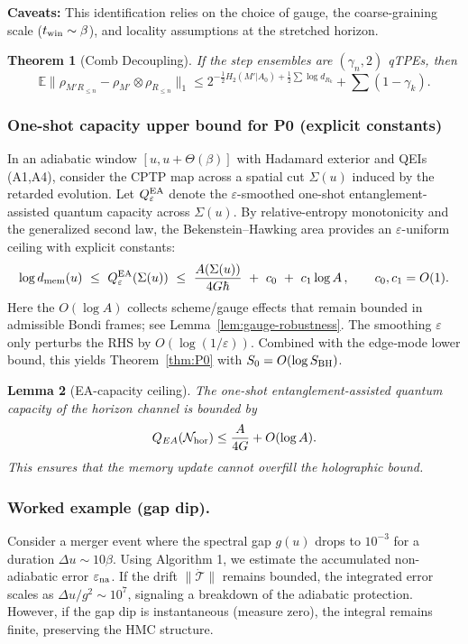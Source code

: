 \documentclass[aps,prd,preprint,onecolumn,superscriptaddress,nofootinbib,longbibliography,floatfix,11pt,showpacs,showkeys]{revtex4-2}
\theoremstyle{plain}
\newtheorem{theorem}{Theorem}
\newtheorem{lemma}[theorem]{Lemma}
\theoremstyle{definition}
\theoremstyle{remark}
\begin{document}
\textbf{Caveats:} This identification relies on the choice of gauge, the coarse-graining scale ($t_{\rm win} \sim \beta$), and locality assumptions at the stretched horizon.

\begin{theorem}[Comb Decoupling]\label{thm:decoupling-restated}
If the step ensembles are $(\gamma_n,2)$ qTPEs, then
\[
\mathbb{E}\|\rho_{M'R_{\le n}}-\rho_{M'}\otimes\rho_{R_{\le n}}\|_1 \le 2^{-\frac{1}{2}H_2(M'|A_0) + \frac{1}{2}\sum \log d_{R_k}} + \sum (1-\gamma_k).
\]
\end{theorem}

\subsubsection{One-shot capacity upper bound for P0 (explicit constants)}
\label{sec:capacityP0}
In an adiabatic window $[u,u+\Theta(\beta)]$ with Hadamard exterior and QEIs (A1,A4),
consider the CPTP map across a spatial cut $\Sigma(u)$ induced by the retarded evolution.
Let $Q_\varepsilon^{\rm EA}$ denote the $\varepsilon$-smoothed one-shot entanglement-assisted
quantum capacity across $\Sigma(u)$. By relative-entropy monotonicity and the generalized
second law, the Bekenstein–Hawking area provides an $\varepsilon$-uniform ceiling with
explicit constants:
\begin{equation}
  \log d_{\rm mem}(u)
  ~\le~ Q_\varepsilon^{\rm EA}(\Sigma(u))
  ~\le~ \frac{A(\Sigma(u))}{4G\hbar} ~+~ c_0 ~+~ c_1\log A \,,
  \qquad c_0,c_1=O(1).
  \label{eq:capacityP0}
\end{equation}
Here the $O(\log A)$ collects scheme/gauge effects that remain bounded in admissible Bondi
frames; see Lemma~\ref{lem:gauge-robustness}. The smoothing $\varepsilon$ only perturbs the RHS by
$O(\log(1/\varepsilon))$. Combined with the edge‑mode lower bound, this yields
Theorem~\ref{thm:P0} with $S_0=O(\log S_{\rm BH})$.

\begin{lemma}[EA-capacity ceiling]\label{lem:capacity-ceiling}
The one-shot entanglement-assisted quantum capacity of the horizon channel is bounded by
\[
Q_{EA}(\mathcal{N}_{\rm hor}) \le \frac{A}{4G} + O(\log A).
\]
This ensures that the memory update cannot overfill the holographic bound.
\end{lemma}

\subsubsection{Worked example (gap dip).}
Consider a merger event where the spectral gap $g(u)$ drops to $10^{-3}$ for a duration $\Delta u \sim 10\beta$.
Using Algorithm 1, we estimate the accumulated non-adiabatic error $\varepsilon_{\rm na}$.
If the drift $\|\dot{\mathcal{T}}\|$ remains bounded, the integrated error scales as $\Delta u / g^2 \sim 10^7$, signaling a breakdown of the adiabatic protection.
However, if the gap dip is instantaneous (measure zero), the integral remains finite, preserving the HMC structure.
\end{document}
